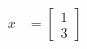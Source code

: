 \documentclass{minimal}
\begin{document}
\begin{align}
  x &= \begin{bmatrix} 1 \\ 3 \end{bmatrix}
\end{align}
\end{document}
